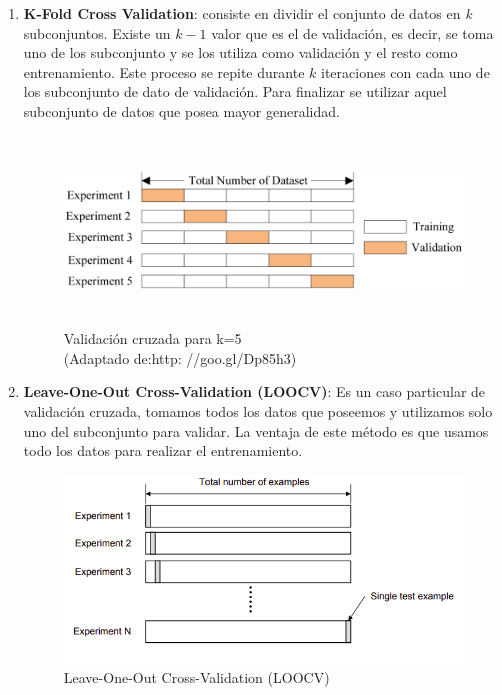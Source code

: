 \begin{enumerate}

\item \textbf{K-Fold Cross Validation}: consiste en dividir el conjunto de datos en \textit{k} subconjuntos. Existe un $k-1 $ valor que es el de validación, es decir, se toma uno de los subconjunto y se los utiliza como validación y el resto como entrenamiento.  Este proceso se repite durante $k $ iteraciones con cada uno de los subconjunto de dato de validación. Para finalizar se utilizar aquel subconjunto de datos que posea mayor generalidad.
\begin{figure}[H]
 \centering
  \includegraphics[height=5cm,keepaspectratio=true,clip=true]{imagenes/Logos/crossvalidat.png}
  \caption{Validación cruzada para k=5\\(Adaptado de:{http: //goo.gl/Dp85h3})}
	\label{Fig: crossvalidation}
\end{figure}

\item \textbf{Leave-One-Out Cross-Validation (LOOCV)}: Es un caso particular de validación cruzada, tomamos todos los datos que poseemos y utilizamos solo uno del subconjunto para validar. La ventaja de este método es que usamos todo los datos para realizar el entrenamiento.

\begin{figure}[H]
 \centering
  \includegraphics[height=5cm,keepaspectratio=true,clip=true]{imagenes/MarcoTeorico/cross-validation-LOOCV.png}
  \caption{Leave-One-Out Cross-Validation (LOOCV)}
	\label{Fig: crossvalidation-LOOCV}
\end{figure}


\end{enumerate}
